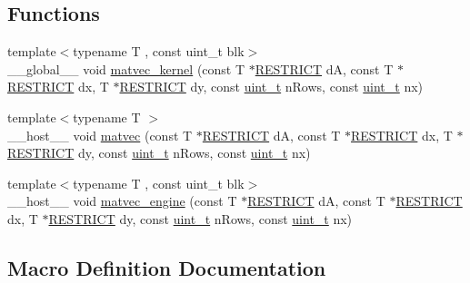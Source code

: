 \subsection*{Functions}
\begin{DoxyCompactItemize}
\item 
{\footnotesize template$<$typename T , const uint\+\_\+t blk$>$ }\\\+\_\+\+\_\+global\+\_\+\+\_\+ void \hyperlink{mv__api_8cuh_acd410f399b691b51c28f6f2abc78834e}{matvec\+\_\+kernel} (const T $\ast$\hyperlink{mv__api_8cuh_aae3356b63849abbe8789dd41648ee90a}{R\+E\+S\+T\+R\+I\+C\+T} d\+A, const T $\ast$\hyperlink{mv__api_8cuh_aae3356b63849abbe8789dd41648ee90a}{R\+E\+S\+T\+R\+I\+C\+T} dx, T $\ast$\hyperlink{mv__api_8cuh_aae3356b63849abbe8789dd41648ee90a}{R\+E\+S\+T\+R\+I\+C\+T} dy, const \hyperlink{mv__types_8h_a12a1e9b3ce141648783a82445d02b58d}{uint\+\_\+t} n\+Rows, const \hyperlink{mv__types_8h_a12a1e9b3ce141648783a82445d02b58d}{uint\+\_\+t} nx)
\item 
{\footnotesize template$<$typename T $>$ }\\\+\_\+\+\_\+host\+\_\+\+\_\+ void \hyperlink{mv__api_8cuh_a988d3fef9af4a5046885005ae4f9ca72}{matvec} (const T $\ast$\hyperlink{mv__api_8cuh_aae3356b63849abbe8789dd41648ee90a}{R\+E\+S\+T\+R\+I\+C\+T} d\+A, const T $\ast$\hyperlink{mv__api_8cuh_aae3356b63849abbe8789dd41648ee90a}{R\+E\+S\+T\+R\+I\+C\+T} dx, T $\ast$\hyperlink{mv__api_8cuh_aae3356b63849abbe8789dd41648ee90a}{R\+E\+S\+T\+R\+I\+C\+T} dy, const \hyperlink{mv__types_8h_a12a1e9b3ce141648783a82445d02b58d}{uint\+\_\+t} n\+Rows, const \hyperlink{mv__types_8h_a12a1e9b3ce141648783a82445d02b58d}{uint\+\_\+t} nx)
\item 
{\footnotesize template$<$typename T , const uint\+\_\+t blk$>$ }\\\+\_\+\+\_\+host\+\_\+\+\_\+ void \hyperlink{mv__api_8cuh_a713dc15fab9fbde981c126aaf911c500}{matvec\+\_\+engine} (const T $\ast$\hyperlink{mv__api_8cuh_aae3356b63849abbe8789dd41648ee90a}{R\+E\+S\+T\+R\+I\+C\+T} d\+A, const T $\ast$\hyperlink{mv__api_8cuh_aae3356b63849abbe8789dd41648ee90a}{R\+E\+S\+T\+R\+I\+C\+T} dx, T $\ast$\hyperlink{mv__api_8cuh_aae3356b63849abbe8789dd41648ee90a}{R\+E\+S\+T\+R\+I\+C\+T} dy, const \hyperlink{mv__types_8h_a12a1e9b3ce141648783a82445d02b58d}{uint\+\_\+t} n\+Rows, const \hyperlink{mv__types_8h_a12a1e9b3ce141648783a82445d02b58d}{uint\+\_\+t} nx)
\end{DoxyCompactItemize}


\subsection{Macro Definition Documentation}
\hypertarget{mv__api_8cuh_a08663feadd063c016866654d18c7ae65}{}
